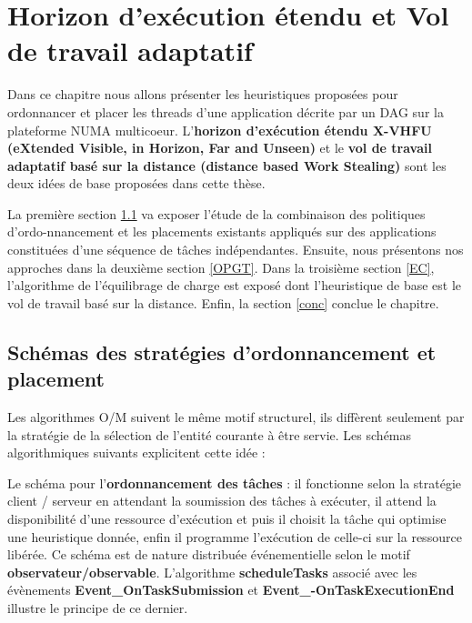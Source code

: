 ﻿\chapter{Horizon d'exécution étendu et Vol de travail adaptatif}\label{chapter:HX}
%
Dans ce chapitre nous allons présenter les heuristiques proposées pour ordonnancer et placer les threads d'une application décrite par un DAG sur la plateforme NUMA multicoeur. L'\textbf{horizon d'exécution étendu X-VHFU (eXtended Visible, in Horizon, Far and Unseen)} et le \textbf{vol de travail adaptatif basé sur la distance (distance based Work Stealing)} sont les deux idées de base proposées dans cette thèse. 

La première section \ref{schSOP} va exposer l'étude de la combinaison des politiques d'ordo-nnancement et les placements existants appliqués sur des applications constituées d'une séquence de tâches indépendantes. 
Ensuite, nous présentons nos approches dans la deuxième section \ref{OPGT}.
Dans la troisième section \ref{EC}, l'algorithme de l'équilibrage de charge est exposé dont l'heuristique de base est le vol de travail basé sur la distance.
Enfin, la section \ref{conc} conclue le chapitre.
\section{Schémas des stratégies d'ordonnancement et placement }\label{schSOP}
%
Les algorithmes O/M suivent le même motif structurel, ils diffèrent seulement par la stratégie de la sélection de l'entité courante à être servie. Les schémas algorithmiques suivants explicitent cette idée :

Le schéma pour l'\textbf{ordonnancement des tâches} : il fonctionne selon la stratégie client / serveur en attendant la soumission des tâches à exécuter, il attend la disponibilité d'une ressource d'exécution et puis il choisit la tâche qui optimise une heuristique donnée, enfin il programme l'exécution de celle-ci sur la ressource libérée. Ce schéma est de nature distribuée événementielle selon le motif \textbf{observateur/observable}. L'algorithme \textbf{scheduleTasks} associé avec les évènements \textbf{Event\_OnTaskSubmission} et  \textbf{Event\_-OnTaskExecutionEnd} illustre le principe de ce dernier.

